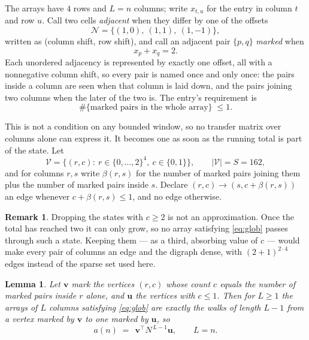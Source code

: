 \documentclass[11pt,a4paper]{article}
\theoremstyle{plain}
\newtheorem{lemma}[theorem]{Lemma}
\theoremstyle{definition}
\newtheorem{remark}[theorem]{Remark}
\begin{document}
The arrays have $4$ rows and $L=n$ columns; write $x_{t,u}$ for the entry in
column $t$ and row $u$. Call two cells \emph{adjacent} when they differ by one of the
offsets
\[
\mathcal N=\{(1,0),\ (1,1),\ (1,-1)\},
\]
written as (column shift, row shift), and call an adjacent pair $\{p,q\}$
\emph{marked} when
\[
x_{p}+x_{q}=2 .
\]
Each unordered adjacency is represented by exactly one offset, all with a nonnegative column
shift, so every pair is named once and only once: the pairs inside a column are seen when
that column is laid down, and the pairs joining two columns when the later of the two is. The
entry's requirement is
\begin{equation}\label{eq:glob}
\#\{\text{marked pairs in the whole array}\}\;\le1.
\end{equation}

This is not a condition on any bounded window, so no transfer matrix over columns alone can
express it. It becomes one as soon as the running total is part of the state. Let
\[
\mathcal V=\bigl\{(r,c):\ r\in\{0,\dots,2\}^{4},\ c\in\{0,1\}\bigr\},
\qquad |\mathcal V|=S=162,
\]
and for columns $r,s$ write $\beta(r,s)$ for the number of marked pairs joining them plus the
number of marked pairs inside $s$. Declare $(r,c)\to(s,c+\beta(r,s))$ an edge whenever
$c+\beta(r,s)\le1$, and no edge otherwise.

\begin{remark}
Dropping the states with $c\ge2$ is not an approximation. Once the total has reached two it
can only grow, so no array satisfying \eqref{eq:glob} passes through such a state. Keeping
them --- as a third, absorbing value of $c$ --- would make every pair of columns an edge and
the digraph dense, with $(2+1)^{2\cdot4}$ edges instead of the sparse set used here.
\end{remark}

\begin{lemma}\label{lem:walk}
Let $\mathbf{v}$ mark the vertices $(r,c)$ whose count $c$ equals the number of marked pairs
inside $r$ alone, and $\mathbf{u}$ the vertices with $c\le1$. Then for $L\ge1$ the arrays
of $L$ columns satisfying \eqref{eq:glob} are exactly the walks of length $L-1$ from a
vertex marked by $\mathbf{v}$ to one marked by $\mathbf{u}$, so
\[
a(n)\;=\;\,\mathbf{v}^{\!\top}N^{\,L-1}\mathbf{u},\qquad L=n .
\]
\end{lemma}
\end{document}
